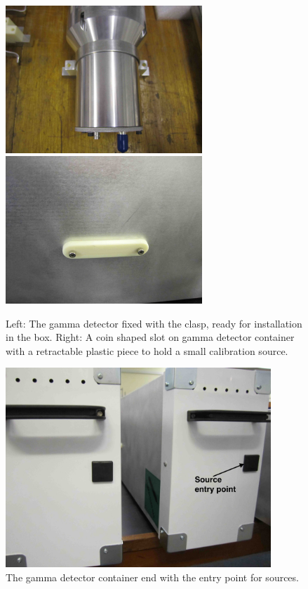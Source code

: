 \begin{figure}[htbp]
\begin{center}
\includegraphics[width=74mm]{Chapter6/figures/gammaDetClasp1.jpg}
\includegraphics[width=74mm]{Chapter6/figures/gammaDetSlot1.jpg}
\caption{Left: The gamma detector fixed with the clasp, ready for installation in the box.
Right: A coin shaped slot on gamma detector container with a retractable plastic piece to hold a small calibration source.}
\label{fig:gammaDetClasp}
\end{center}
\end{figure}

\begin{figure}[htbp]
\begin{center}\includegraphics[width=100mm]{Chapter6/figures/gammaContainerEnd2.jpg}
\caption{The gamma detector container end with the entry point for sources.}
\label{fig:gammaBoxEnd}
\end{center}
\end{figure}

